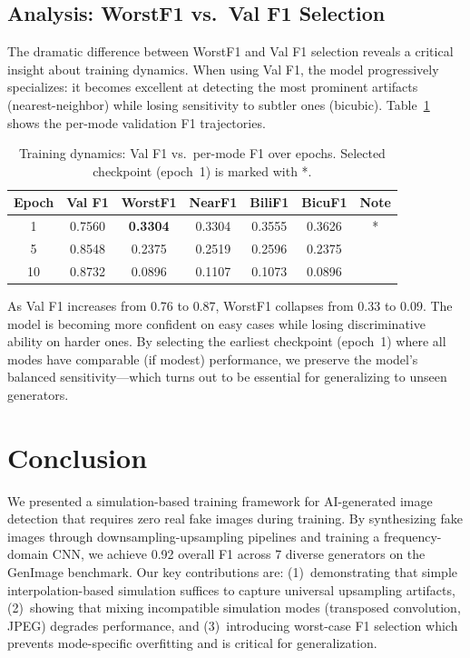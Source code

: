 \documentclass[11pt,a4paper]{article}
\begin{document}
\subsection{Analysis: WorstF1 vs.\ Val F1 Selection}

The dramatic difference between WorstF1 and Val F1 selection reveals a critical insight about training dynamics. When using Val F1, the model progressively specializes: it becomes excellent at detecting the most prominent artifacts (nearest-neighbor) while losing sensitivity to subtler ones (bicubic). Table~\ref{tab:training-dyn} shows the per-mode validation F1 trajectories.

\begin{table}[t]
\centering
\caption{Training dynamics: Val F1 vs.\ per-mode F1 over epochs. Selected checkpoint (epoch~1) is marked with *.}
\label{tab:training-dyn}
\begin{tabular}{ccccccc}
\toprule
Epoch & Val F1 & WorstF1 & NearF1 & BiliF1 & BicuF1 & Note \\
\midrule
1 & 0.7560 & \textbf{0.3304} & 0.3304 & 0.3555 & 0.3626 & * \\
5 & 0.8548 & 0.2375 & 0.2519 & 0.2596 & 0.2375 & \\
10 & 0.8732 & 0.0896 & 0.1107 & 0.1073 & 0.0896 & \\
\bottomrule
\end{tabular}
\end{table}

As Val F1 increases from 0.76 to 0.87, WorstF1 collapses from 0.33 to 0.09. The model is becoming more confident on easy cases while losing discriminative ability on harder ones. By selecting the earliest checkpoint (epoch~1) where all modes have comparable (if modest) performance, we preserve the model's balanced sensitivity---which turns out to be essential for generalizing to unseen generators.

\section{Conclusion}

We presented a simulation-based training framework for AI-generated image detection that requires zero real fake images during training. By synthesizing fake images through downsampling-upsampling pipelines and training a frequency-domain CNN, we achieve 0.92 overall F1 across 7 diverse generators on the GenImage benchmark. Our key contributions are: (1)~demonstrating that simple interpolation-based simulation suffices to capture universal upsampling artifacts, (2)~showing that mixing incompatible simulation modes (transposed convolution, JPEG) degrades performance, and (3)~introducing worst-case F1 selection which prevents mode-specific overfitting and is critical for generalization.
\end{document}
